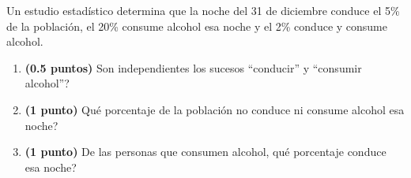 
Un estudio estadístico determina que la noche del 31 de diciembre conduce el 5\% de la población, el 20\% consume alcohol esa noche y el 2\% conduce y consume alcohol.
\begin{enumerate}[label=\alph*)]
\item \textbf{(0.5 puntos)} \textquestiondown{}Son independientes los sucesos ``conducir'' y ``consumir alcohol''?
\item \textbf{(1 punto)} \textquestiondown{}Qué porcentaje de la población no conduce ni consume alcohol esa noche?
\item \textbf{(1 punto)} De las personas que consumen alcohol, \textquestiondown{}qué porcentaje conduce esa noche?
\end{enumerate}
